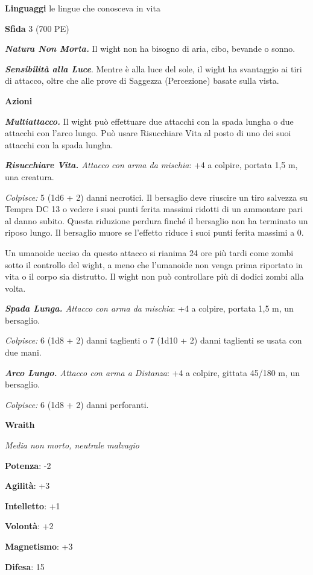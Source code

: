 \begin{multicols}{2}
\textbf{Linguaggi} le lingue che conosceva in vita

\textbf{Sfida} 3 (700 PE)

\emph{\textbf{Natura Non Morta.}} Il wight non ha bisogno di aria, cibo,
bevande o sonno.

\emph{\textbf{Sensibilità alla Luce}}. Mentre è alla luce del sole, il
wight ha svantaggio ai tiri di attacco, oltre che alle prove di Saggezza
(Percezione) basate sulla vista.

\textbf{Azioni}

\emph{\textbf{Multiattacco.}} Il wight può effettuare due attacchi con
la spada lungha o due attacchi con l'arco lungo. Può usare Risucchiare
Vita al posto di uno dei suoi attacchi con la spada lungha.

\emph{\textbf{Risucchiare Vita.} Attacco con arma da mischia}: +4 a
colpire, portata 1,5 m, una creatura.

\emph{Colpisce:} 5 (1d6 + 2) danni necrotici. Il bersaglio deve riuscire
un tiro salvezza su Tempra DC 13 o vedere i suoi punti ferita
massimi ridotti di un ammontare pari al danno subito. Questa riduzione
perdura finché il bersaglio non ha terminato un riposo lungo. Il
bersaglio muore se l'effetto riduce i suoi punti ferita massimi a 0.

Un umanoide ucciso da questo attacco si rianima 24 ore più tardi come
zombi sotto il controllo del wight, a meno che l'umanoide non venga
prima riportato in vita o il corpo sia distrutto. Il wight non può
controllare più di dodici zombi alla volta.

\emph{\textbf{Spada Lunga.} Attacco con arma da mischia}: +4 a colpire,
portata 1,5 m, un bersaglio.

\emph{Colpisce:} 6 (1d8 + 2) danni taglienti o 7 (1d10 + 2) danni
taglienti se usata con due mani.

\emph{\textbf{Arco Lungo.} Attacco con arma a Distanza}: +4 a colpire,
gittata 45/180 m, un bersaglio.

\emph{Colpisce:} 6 (1d8 + 2) danni perforanti.

\textbf{Wraith}

\emph{Media non morto, neutrale malvagio}

\textbf{Potenza}: -2

\textbf{Agilità}: +3

\textbf{Intelletto}: +1

\textbf{Volontà}: +2

\textbf{Magnetismo}: +3

\textbf{Difesa}: 15


\end{multicols}
